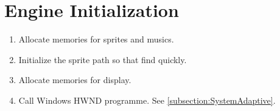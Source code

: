 \section{Engine Initialization}

\begin{enumerate}
	\item Allocate memories for sprites and musics.
	\item Initialize the sprite path so that find quickly.
	\item Allocate memories for display.
	\item Call Windows HWND programme. See \ref{subsection:SystemAdaptive}.
\end{enumerate}

